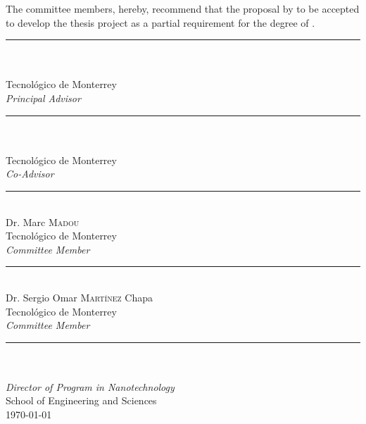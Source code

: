\documentclass[
11pt, 
oneside,
english,
onehalfspacing,
onehalfspacing,
parskip,
headsepline,
]{MastersDoctoralThesis}
\begin{document}
\begin{committee}
\addchaptertocentry{\supervisingcommittee} %
The committee members, hereby, recommend that the proposal by \authorname \text{ }to be accepted to develop the thesis project as a partial requirement for the degree of \degreename.

\begin{flushright} \large

\bigskip
\bigskip
\medskip

\noindent \rule[0.0em]{15em}{0.5pt}\\ %
\supname\\
Tecnológico de Monterrey\\
\emph{Principal Advisor}

\bigskip
\bigskip
\medskip

\noindent \rule[0.0em]{15em}{0.5pt}\\ %
\cosupname\\
Tecnológico de Monterrey\\
\emph{Co-Advisor}

\bigskip
\bigskip
\medskip

\noindent \rule[0.0em]{15em}{0.5pt}\\ %
Dr. Marc \textsc{Madou}\\
Tecnológico de Monterrey\\
\emph{Committee Member}

\bigskip
\bigskip
\medskip

\noindent \rule[0.0em]{15em}{0.5pt}\\ %
Dr. Sergio Omar \textsc{Martínez} Chapa\\
Tecnológico de Monterrey\\
\emph{Committee Member}

\end{flushright}

\vfill

\begin{center}

\bigskip
\bigskip
\medskip

\noindent \rule[0.0em]{15em}{0.5pt}\\ %
\cosupname \\
\emph{Director of Program in Nanotechnology}\\
School of Engineering and Sciences\\

\bigskip
{\addressname \text{, } \large \today}\\[0cm]

\end{center}
\end{committee}
\end{document}
